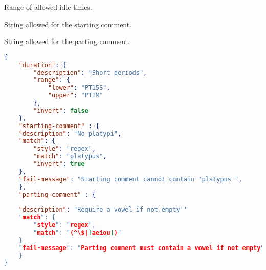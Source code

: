 \documentclass[10pt]{article}
\begin{document}
 Range of allowed idle times.

 String allowed for the starting comment.

 String allowed for the parting comment.


\example
\begin{lstlisting}[language=json]
{
    "duration": {
        "description": "Short periods",
        "range": {
            "lower": "PT15S",
            "upper": "PT1M"
        },
        "invert": false
    },
    "starting-comment" : {
	"description": "No platypi",
	"match": {
	    "style": "regex",
	    "match": "platypus",
	    "invert": true
	},
	"fail-message": "Starting comment cannot contain 'platypus'",
    },
    "parting-comment" : {
     
	"description": "Require a vowel if not empty''
	"match": {
	    "style": "regex",
	    "match": "(^\$|[aeiou])"
	}
	"fail-message": "Parting comment must contain a vowel if not empty", 
    }
}

\end{lstlisting}
\end{document}
